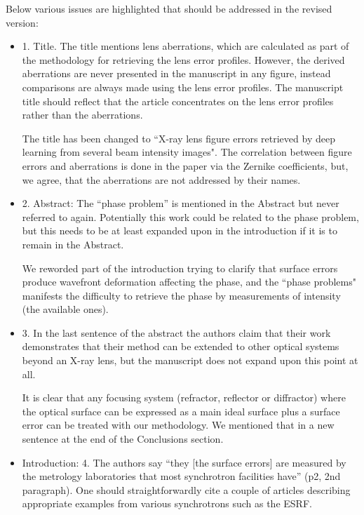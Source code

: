 \documentclass[11pt]{letter} %
\newcommand{\inred}[1]{{\color{red}#1}}
\begin{document}
\begin{letter}{}
Below various issues are highlighted that should be addressed in the revised version:

\begin{itemize}
    \item 1. Title. The title mentions lens aberrations, which are calculated as part of the methodology for retrieving the lens error profiles. However, the derived aberrations are never presented in the manuscript in any figure, instead comparisons are always made using the lens error profiles. The manuscript title should reflect that the article concentrates on the lens error profiles rather than the aberrations.
    
    \inred{The title has been changed to ``X-ray lens figure errors retrieved by deep learning from several beam intensity images". The correlation between figure errors and aberrations is done in the paper via the Zernike coefficients, but, we agree, that the aberrations are not addressed by their names.}
    
    \item 2. Abstract: The “phase problem” is mentioned in the Abstract but never referred to again. Potentially this work could be related to the phase problem, but this needs to be at least expanded upon in the introduction if it is to remain in the Abstract.
    
    \inred{We reworded part of the introduction trying to clarify that surface errors produce wavefront deformation affecting the phase, and the ``phase problems" manifests the difficulty to retrieve the phase by measurements of intensity (the available ones).}
    
    \item 3. In the last sentence of the abstract the authors claim that their work demonstrates that their method can be extended to other optical systems beyond an X-ray lens, but the manuscript does not expand upon this point at all.
    
    \inred{It is clear that any focusing system (refractor, reflector or diffractor) where the optical surface can be expressed as a main ideal surface plus a surface error can be treated with our methodology. We mentioned that in a new sentence at the end of the Conclusions section.}
    

    \item Introduction: 4. The authors say “they [the surface errors] are measured by the metrology laboratories that most synchrotron facilities have” (p2, 2nd paragraph). One should straightforwardly cite a couple of articles describing appropriate examples from various synchrotrons such as the ESRF.
    

\end{itemize}
\end{letter}
\end{document}
